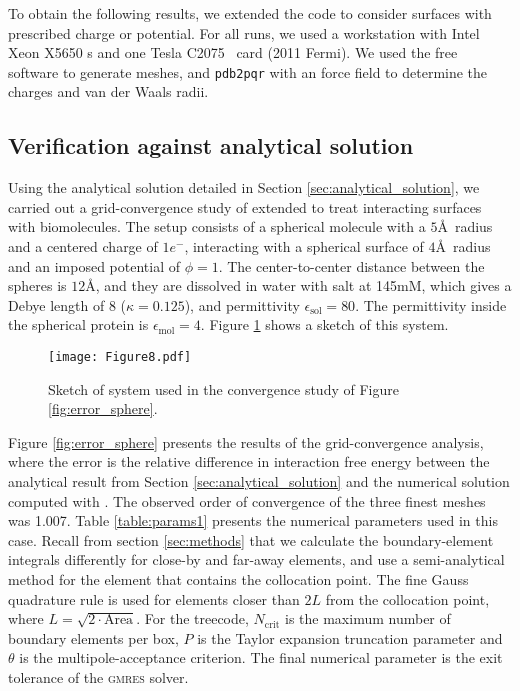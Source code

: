 
To obtain the following results, we extended the \pygbe code to consider surfaces with prescribed charge or potential. For all runs, we used a workstation with Intel Xeon X5650 \cpu s  and one \nvidia Tesla C2075 \gpu\ card (2011 Fermi). We used the free \msms software \cite{SannerOlsonSpehner1995} to generate meshes, and \texttt{pdb2pqr} \cite{Dolinsky04} with an \amber force field to determine the charges and van der Waals radii. 

\subsection{Verification against analytical solution} \label{sec:verification}

Using the analytical solution detailed in Section \ref{sec:analytical_solution}, we carried out a grid-convergence study of \pygbe extended to treat interacting surfaces with biomolecules. The setup consists of a spherical molecule with a $5$\AA~radius and a centered charge of $1e^-$, interacting with a spherical surface of $4$\AA~radius and an imposed potential of $\phi=1$. The center-to-center distance between the spheres is $12$\AA, and they are dissolved in water with salt at 145mM, which gives a Debye length of 8 ($\kappa = 0.125$), and permittivity $\epsilon_\text{sol} = 80$. The permittivity inside the spherical protein is $\epsilon_\text{mol} = 4$. Figure \ref{fig:twosphere_num} shows a sketch of this system.

\begin{figure}[h] %
   \centering
   \texttt{[image: Figure8.pdf]} 
   \caption{Sketch of system used in the convergence study of Figure \ref{fig:error_sphere}.}
   \label{fig:twosphere_num}
\end{figure}

Figure \ref{fig:error_sphere} presents the results of the grid-convergence analysis, where the error is the relative difference in interaction free energy between the analytical result from Section \ref{sec:analytical_solution} and the numerical solution computed with \pygbe. The observed order of convergence of the three finest meshes was 1.007. Table \ref{table:params1} presents the numerical parameters used in this case. Recall from section \ref{sec:methods} that we calculate the boundary-element integrals differently for close-by and far-away elements, and use a semi-analytical method for the element that contains the collocation point. The fine Gauss quadrature rule is used for elements closer than $2L$ from the collocation point, where $L=\sqrt{2\cdot \text{Area}}$. For the treecode,  $N_{\text{crit}}$ is the maximum number of boundary elements per box, $P$ is the Taylor expansion truncation parameter and $\theta$ is the multipole-acceptance criterion. The final numerical parameter is the exit tolerance of the \textsc{gmres} solver.

